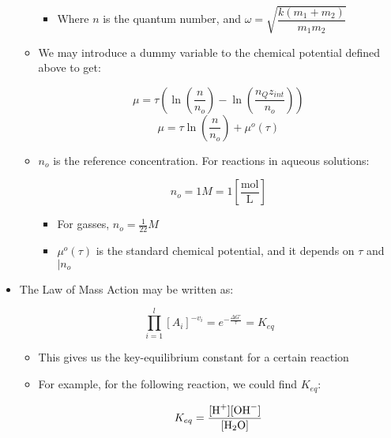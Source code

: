 \begin{itemize}
\begin{itemize}
        \begin{itemize}

          \item Where $n$ is the quantum number, and $\omega=\sqrt{\dfrac{k(m_1+m_2)}{m_1m_2}}$

        \end{itemize}

      \item We may introduce a dummy variable to the chemical potential defined above to get:

        $$\mu=\tau\left( \ln\left( \frac{n}{n_o} \right)-\ln\left( \frac{n_Qz_{int}}{n_o} \right) \right)$$
        $$\mu=\tau\ln\left( \frac{n}{n_o} \right)+\mu^o(\tau)$$

      \item $n_o$ is the reference concentration. For reactions in aqueous solutions:

        $$n_o=1M=1\left[ \frac{\si{\mole}}{\si{\liter}} \right]$$

        \begin{itemize}

          \item For gasses, $n_o=\frac{1}{22}M$

          \item $\mu^o(\tau)$ is the standard chemical potential, and it depends on $\tau$ and $|n_o$

        \end{itemize}

    \end{itemize}

  \item The Law of Mass Action may be written as:

    $$\prod_{i=1}^l[A_i]^{-v_i}=e^{-\frac{\Delta G^{\circ}}{\tau}}=K_{eq}$$
    
    \begin{itemize}

      \item This gives us the key-equilibrium constant for a certain reaction

      \item For example, for the following reaction, we could find $K_{eq}$:

        \begin{center}
        \end{center}

        $$K_{eq}=\frac{\ce{[H+][OH^-]}}{\ce{[H2O]}}$$

    \end{itemize}

\end{itemize}





